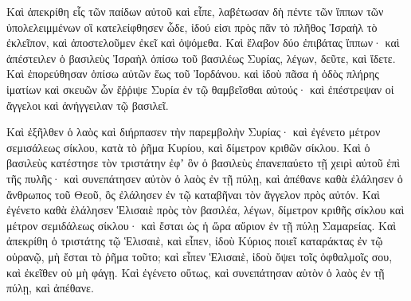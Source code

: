 {Καὶ ἀπεκρίθη εἷς τῶν παίδων αὐτοῦ καὶ εἶπε, λαβέτωσαν δὴ πέντε τῶν ἵππων τῶν ὑπολελειμμένων οἳ κατελείφθησεν ὧδε, ἰδού εἰσι πρὸς πᾶν τὸ πλῆθος Ἰσραὴλ τὸ ἐκλεῖπον, καὶ ἀποστελοῦμεν ἐκεῖ καὶ ὀψόμεθα.
Καὶ ἔλαβον δύο ἐπιβάτας ἵππων· καὶ ἀπέστειλεν ὁ βασιλεὺς Ἰσραὴλ ὀπίσω τοῦ βασιλέως Συρίας, λέγων, δεῦτε, καὶ ἴδετε.
Καὶ ἐπορεύθησαν ὀπίσω αὐτῶν ἕως τοῦ Ἰορδάνου. καὶ ἰδοὺ πᾶσα ἡ ὁδὸς πλήρης ἱματίων καὶ σκευῶν ὧν ἔῤῥιψε Συρία ἐν τῷ θαμβεῖσθαι αὐτούς· καὶ ἐπέστρεψαν οἱ ἄγγελοι καὶ ἀνήγγειλαν τῷ βασιλεῖ.
\par }{\PP {}Καὶ ἐξῆλθεν ὁ λαὸς καὶ διήρπασεν τὴν παρεμβολὴν Συρίας· καὶ ἐγένετο μέτρον σεμισάλεως σίκλου, κατὰ τὸ ῥῆμα Κυρίου, καὶ δίμετρον κριθῶν σίκλου.
Καὶ ὁ βασιλεὺς κατέστησε τὸν τριστάτην ἐφʼ ὃν ὁ βασιλεὺς ἐπανεπαύετο τῇ χειρὶ αὐτοῦ ἐπὶ τῆς πυλῆς· καὶ συνεπάτησεν αὐτὸν ὁ λαὸς ἐν τῇ πύλῃ, καὶ ἀπέθανε καθὰ ἐλάλησεν ὁ ἄνθρωπος τοῦ Θεοῦ, ὃς ἐλάλησεν ἐν τῷ καταβῆναι τὸν ἄγγελον πρὸς αὐτόν.
Καὶ ἐγένετο καθὰ ἐλάλησεν Ἑλισαιὲ πρὸς τὸν βασιλέα, λέγων, δίμετρον κριθῆς σίκλου καὶ μέτρον σεμιδάλεως σίκλου· καὶ ἔσται ὡς ἡ ὥρα αὔριον ἐν τῇ πύλῃ Σαμαρείας.
Καὶ ἀπεκρίθη ὁ τριστάτης τῷ Ἑλισαιὲ, καὶ εἶπεν, ἰδοὺ Κύριος ποιεῖ καταράκτας ἐν τῷ οὐρανῷ, μὴ ἔσται τὸ ῥῆμα τοῦτο; καὶ εἶπεν Ἑλισαιὲ, ἰδοὺ ὄψει τοῖς ὀφθαλμοῖς σου, καὶ ἐκεῖθεν οὐ μὴ φάγῃ.
Καὶ ἐγένετο οὕτως, καὶ συνεπάτησαν αὐτὸν ὁ λαὸς ἐν τῇ πύλῃ, καὶ ἀπέθανε.

}
